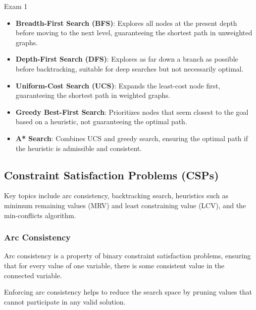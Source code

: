\begin{examnotes}{Exam 1}
\begin{highlight}
\begin{itemize}
                \begin{itemize}
                    \item \textbf{Breadth-First Search (BFS)}: Explores all nodes at the present depth before moving to the next level, guaranteeing the shortest path in unweighted graphs.
                    \item \textbf{Depth-First Search (DFS)}: Explores as far down a branch as possible before backtracking, suitable for deep searches but not necessarily optimal.
                    \item \textbf{Uniform-Cost Search (UCS)}: Expands the least-cost node first, guaranteeing the shortest path in weighted graphs.
                    \item \textbf{Greedy Best-First Search}: Prioritizes nodes that seem closest to the goal based on a heuristic, not guaranteeing the optimal path.
                    \item \textbf{A* Search}: Combines UCS and greedy search, ensuring the optimal path if the heuristic is admissible and consistent.
                \end{itemize}
        \end{itemize}
    \end{highlight}

    \subsection*{Constraint Satisfaction Problems (CSPs)}

    Key topics include arc consistency, backtracking search, heuristics such as minimum remaining values (MRV) and least constraining value (LCV), and the min-conflicts algorithm.
    
    \subsubsection*{Arc Consistency}
    
    Arc consistency is a property of binary constraint satisfaction problems, ensuring that for every value of one variable, there is some consistent value in the connected variable.
    
    \begin{highlight}
        Enforcing arc consistency helps to reduce the search space by pruning values that cannot participate in any valid solution.
        

\end{highlight}
\end{examnotes}
